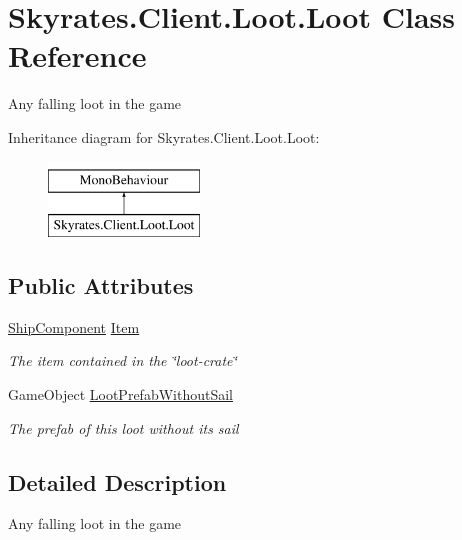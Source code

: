 \hypertarget{class_skyrates_1_1_client_1_1_loot_1_1_loot}{\section{Skyrates.\-Client.\-Loot.\-Loot Class Reference}
\label{class_skyrates_1_1_client_1_1_loot_1_1_loot}
}


Any falling loot in the game  


Inheritance diagram for Skyrates.\-Client.\-Loot.\-Loot\-:\begin{figure}[H]
\begin{center}
\leavevmode
\includegraphics[height=2.000000cm]{class_skyrates_1_1_client_1_1_loot_1_1_loot}
\end{center}
\end{figure}
\subsection*{Public Attributes}
\begin{DoxyCompactItemize}
\item 
\hyperlink{class_skyrates_1_1_client_1_1_ship_1_1_ship_component}{Ship\-Component} \hyperlink{class_skyrates_1_1_client_1_1_loot_1_1_loot_a295eba520dd781c17f67c70799aa2322}{Item}
\begin{DoxyCompactList}\small\item\em The item contained in the \char`\"{}loot-\/crate\char`\"{} \end{DoxyCompactList}\item 
Game\-Object \hyperlink{class_skyrates_1_1_client_1_1_loot_1_1_loot_ad63bdbaca44faa51af93fc8f480206b4}{Loot\-Prefab\-Without\-Sail}
\begin{DoxyCompactList}\small\item\em The prefab of this loot without its sail \end{DoxyCompactList}\end{DoxyCompactItemize}


\subsection{Detailed Description}
Any falling loot in the game 



